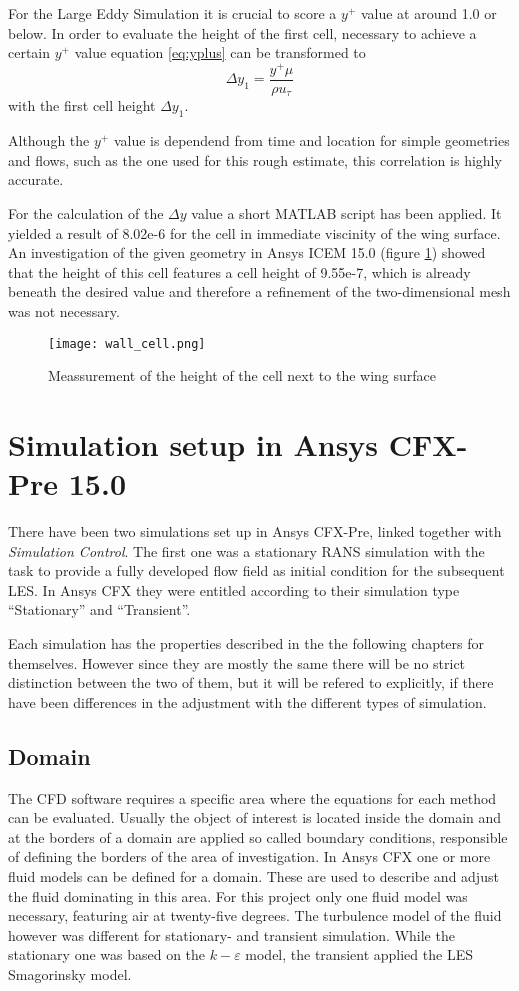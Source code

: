 For the Large Eddy Simulation it is crucial to score a $y^+$ value at around 1.0 or below. In order to evaluate the height of the first cell, necessary to achieve a certain $y^+$ value equation \ref{eq:yplus} can be transformed to
\begin{equation}
\Delta y_1 = \frac{y^+ \mu}{\rho u_{\tau}}
\end{equation}  
with the first cell height $\Delta y_1$.

Although the $y^+$ value is dependend from time and location for simple geometries and flows, such as the one used for this rough estimate, this correlation is highly accurate.

For the calculation of the $\Delta y$ value a short MATLAB\textsuperscript{\textregistered} script has been applied. It yielded a result of 8.02e-6 for the cell in immediate viscinity of the wing surface. An investigation of the given geometry in Ansys ICEM 15.0 (figure \ref{fig:y1_height}) showed that the height of this cell features a cell height of 9.55e-7, which is already beneath the desired value and therefore a refinement of the two-dimensional mesh was not necessary. 
\begin{figure}[ht]
\centering
\texttt{[image: wall\_cell.png]}
\caption{Meassurement of the height of the cell next to the wing surface}
\label{fig:y1_height}
\end{figure}

\section{Simulation setup in Ansys CFX-Pre 15.0}
There have been two simulations set up in Ansys CFX-Pre, linked together with \emph{Simulation Control}. The first one was a stationary RANS simulation with the task to provide a fully developed flow field as initial condition for the subsequent LES. In Ansys CFX they were entitled according to their simulation type ``Stationary'' and ``Transient''.

Each simulation has the properties described in the the following chapters for themselves. However since they are mostly the same there will be no strict distinction between the two of them, but it will be refered to explicitly, if there have been differences in the adjustment with the different types of simulation.
\subsection{Domain}
The CFD software requires a specific area where the equations for each method can be evaluated. Usually the object of interest is located inside the domain and at the borders of a domain are applied so called boundary conditions, responsible of defining the borders of the area of investigation.
In Ansys CFX one or more fluid models can be defined for a domain. These are used to describe and adjust the fluid dominating in this area. For this project only one fluid model was necessary, featuring air at twenty-five degrees.
The turbulence model of the fluid however was different for stationary- and transient simulation. While the stationary one was based on the $k-\varepsilon$ model, the transient applied the LES Smagorinsky model.
